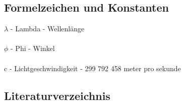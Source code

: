 \documentclass[11pt]{scrartcl}
\begin{document}
\subsection{Formelzeichen und Konstanten}
$\lambda$ - Lambda - Wellenlänge\\
\\
$\phi$ - Phi - Winkel\\
\\
c - Lichtgeschwindigkeit - 299 792 458 meter pro sekunde
\clearpage

\subsection{Literaturverzeichnis}
\begingroup
\renewcommand{\section}[2]{}
\end{document}

